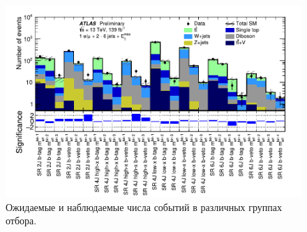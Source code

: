 \documentclass[a4paper, 10pt, twocolumn]{article}
\begin{document}
\begin{figure}[p]%
	\centering
	\includegraphics[width=\linewidth]{figures/gg-qq-events}
	\caption{Ожидаемые и наблюдаемые числа событий в различных группах 
	отбора.}
	\label{fig:gg-qq-events}
\end{figure}%
\end{document}

